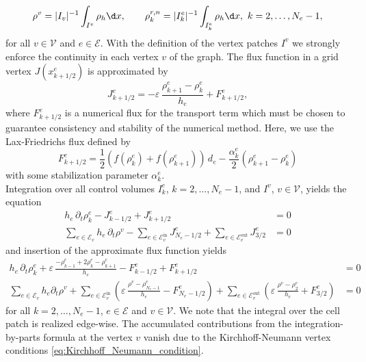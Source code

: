 \begin{align*}	
	\rho^{v}= |I_v|^{-1}\int_{I^v}\rho_h\d x, \qquad
	\rho_k^{r,n} = |I_k^e|^{-1}\int_{I_k^e} \rho_h\d x,\ k=2,\ldots,N_e-1,
\end{align*}
for all $v \in \mathcal{V}$ and $e \in \mathcal{E}$. With the definition of the vertex patches $I^v$ we strongly enforce the continuity in each vertex $v$ of the graph. The flux function in a grid vertex $J(x^e_{k+1/2})$ is approximated by
\begin{equation*}
	J_{k+1/2}^e = -\varepsilon\,\frac{\rho_{k+1}^e-\rho_k^e}{h_e}
	+ F^e_{k+1/2},
\end{equation*}
where $F^e_{k+1/2}$ is a numerical flux for the transport term which must be chosen to guarantee consistency and stability of the numerical method. Here, we use the Lax-Friedrichs flux defined by
\begin{equation*}
	F^e_{k+1/2} = \frac{1}{2} (f(\rho_k^e) + f(\rho_{k+1}^e))\,d_e - \frac{\alpha_k^e}2
	(\rho_{k+1}^e - \rho_k^e) 
\end{equation*}
with some stabilization parameter $\alpha_k^e$. \\
Integration over all control volumes $I_k^e$, $k=2,\ldots,N_e-1$, and $I^v$, $v\in \mathcal{V}$, yields the equation
\begin{align*}
	h_e\,\partial_t \rho_k^e - J^e_{k-1/2} + J^e_{k+1/2} &= 0 \\
	\sum_{e\in \mathcal{E}_v} h_e\,\partial_t \rho^v
	- \sum_{e\in \mathcal{E}_v^{\text{in}}} J^e_{N_e-1/2} 
	+ \sum_{e\in \mathcal{E}_v^{\text{out}}} J^e_{3/2} &= 0
\end{align*}
and insertion of the approximate flux function yields
\begin{align*}
	h_e\,\partial_t \rho_k^e + \varepsilon\,\frac{-\rho_{k-1}^e +
	2\rho_k^e - \rho_{k+1}^e}{h_e} - F_{k-1/2}^e + F_{k+1/2}^e &= 0
	  \\
	\sum_{e\in \mathcal{E}_v} h_e\partial_t\rho^v
	+ \sum_{e\in \mathcal{E}_v^{\text{in}}}
	\left(\varepsilon\,\frac{\rho^v-\rho_{N_e-1}^e}{h_e} -
	F^e_{N_e-1/2}\right)
	+ \sum_{e\in \mathcal{E}_v^{\text{out}}}
	\left(\varepsilon\,\frac{\rho^v-\rho_2^e}{h_e} + F^e_{3/2}\right)
	&= 0
\end{align*}
for all $k = 2,\ldots,N_e-1$, $e\in \mathcal{E}$ and $v \in \mathcal{V}$. We note that the integral over the cell patch is realized edge-wise. The accumulated contributions from the integration-by-parts formula at the vertex $v$ vanish due to the Kirchhoff-Neumann vertex conditions \eqref{eq:Kirchhoff_Neumann_condition}. \\
